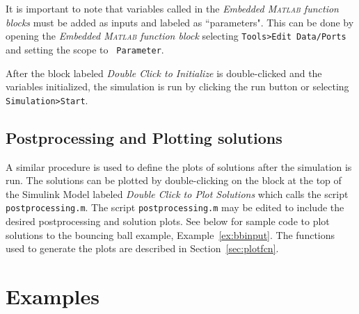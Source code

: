 \documentclass{article}
\newcommand{\matlab}{\textsc{Matlab}}
\begin{document}
% 
\label{scr:initializationBB_inst}

It is important to note that variables called in the {\em Embedded \matlab{} function blocks}
must be added as inputs and labeled as ``parameters". This can be done by opening the {\em Embedded \matlab{} function block}
selecting {\tt Tools>Edit Data/Ports} and setting the scope to {\tt
Parameter}.

After the block labeled {\em Double Click to Initialize} is double-clicked and the variables initialized, the simulation is run by clicking the run button or selecting {\tt Simulation>Start}.


\subsection{Postprocessing and Plotting solutions}
\label{sec:postprocessing}

A similar procedure is used to define the plots of solutions after the simulation is run. 
The solutions can be plotted by double-clicking on the block at the top of the Simulink Model 
labeled {\em Double Click to Plot Solutions} which calls the script {\tt postprocessing.m}. 
The script {\tt postprocessing.m} may be edited to include the desired postprocessing and solution plots. 
See below for sample code to plot solutions to the bouncing ball example, Example~\ref{ex:bbinput}. 
The functions used to generate the plots are described in Section~\ref{sec:plotfcn}.\\

% 
\label{scr:postprocesingBB_inst}



\section{Examples}
\label{sec:examples}














\end{document}
